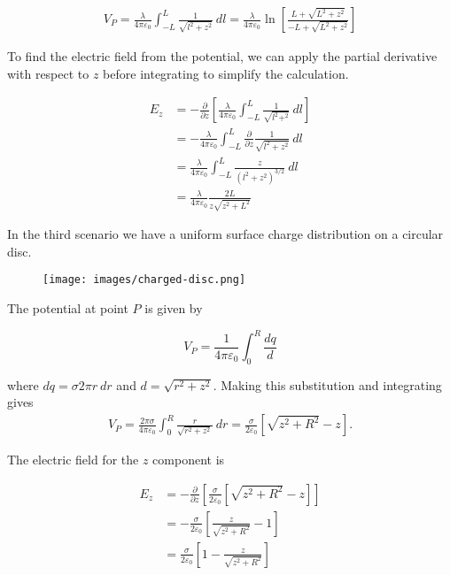 \documentclass{article}
\newcommand{\delz}{\frac{\partial}{\partial z}}
\begin{document}
\begin{align*}
    V_P = \frac{\lambda}{4\pi\varepsilon_0} \int_{-L}^L \frac{1}{\sqrt{l^2 + z^2}}\ dl = \frac{\lambda}{4\pi\varepsilon_0} \ln \left[ \frac{L + \sqrt{L^2 + z^2}}{-L + \sqrt{L^2 + z^2}}\right]
\end{align*}

To find the electric field from the potential, we can apply the partial derivative with respect to $z$ before integrating to simplify the calculation. 

\begin{align*}
    E_z &= -\delz \left[ \frac{\lambda}{4\pi\varepsilon_0} \int_{-L}^{L} \frac{1}{\sqrt{l^2 + ^2}}\ dl \right] \\
    &=-\frac{\lambda}{4\pi\varepsilon_0}\int_{-L}^L \delz \frac{1}{\sqrt{l^2 + z^2}}\ dl \\
    &= \frac{\lambda}{4\pi\varepsilon_0}\int_{-L}^L \frac{z}{(l^2 + z^2)^{3/2}}\ dl \\
    &= \frac{\lambda}{4\pi\varepsilon_0}\frac{2L}{z \sqrt{z^{2} + L^{2}}}
\end{align*}

In the third scenario we have a uniform surface charge distribution on a circular disc. 

\begin{figure}[h]
    \centering
    \texttt{[image: images/charged-disc.png]}
\end{figure}

The potential at point $P$ is given by 

$$
V_P = \frac{1}{4\pi\varepsilon_0} \int_0^R \frac{dq}{d}
$$

where $dq = \sigma 2\pi r\ dr$ and $d = \sqrt{r^2 + z^2}$. Making this substitution and integrating gives 
\begin{align*}
    V_P = \frac{2\pi\sigma}{4\pi \varepsilon_0}\int_0^R \frac{r}{\sqrt{r^2 + z^2}}\ dr = \frac{\sigma}{2 \varepsilon_0} \left[\sqrt{z^{2} + R^{2}} - z\right].
\end{align*}

The electric field for the $z$ component is 

\begin{align*}
    E_z &= -\delz \left[ \frac{\sigma}{2 \varepsilon_0} \left[\sqrt{z^{2} + R^{2}} - z\right] \right] \\
    &=-\frac{\sigma}{2\varepsilon_0}\left[ \frac{z}{\sqrt{z^2 + R^2}} - 1\right] \\
    &= \frac{\sigma}{2\varepsilon_0}\left[1 - \frac{z}{\sqrt{z^2 + R^2}}\right]
\end{align*}
\end{document}

